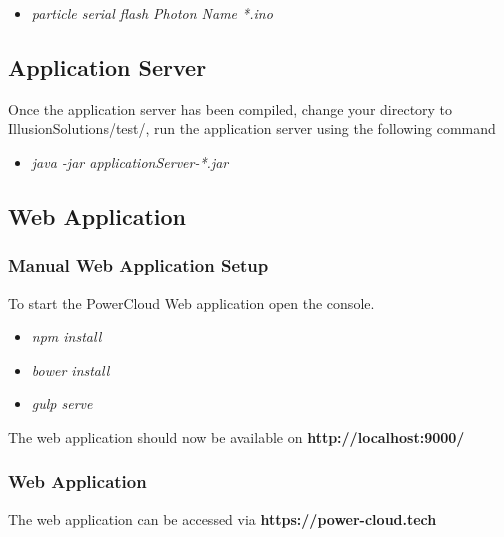 \documentclass[a4paper,10pt]{article}
\begin{document}
	\begin{itemize}
		\item \textit{particle serial flash Photon Name *.ino}
	\end{itemize}
	
	\subsection{Application Server}
	Once the application server has been compiled, change your directory to IllusionSolutions/test/, run the application server using the following command
	
	\begin{itemize}
		\item \textit{java -jar applicationServer-*.jar}
	\end{itemize}
	
	\subsection{Web Application}
		\subsubsection{Manual Web Application Setup}
		To start the PowerCloud Web application open the console.
		
		\begin{itemize}
			\item \textit{npm install}
			\item \textit{bower install}
			\item \textit{gulp serve}
		\end{itemize}
	
		The web application should now be available on \textbf{http://localhost:9000/}
		
		\subsubsection{Web Application}
		The web application can be accessed via \textbf{https://power-cloud.tech}
\end{document}
